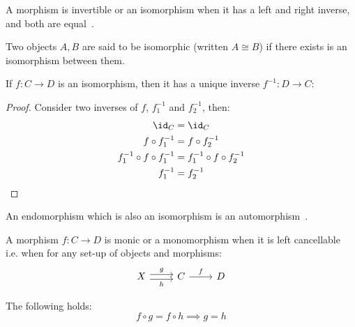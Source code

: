 \begin{definition}[Isomorphism]
  A morphism is invertible or an isomorphism when it has a left and right
  inverse, and both are equal~\parencite[p.~19]{lane:working_mathematician}.
\end{definition}

\begin{remark}
  Two objects $A, B$ are said to be isomorphic (written $A\cong B$) if there
  exists is an isomorphism between them.
\end{remark}

\begin{theorem}
  If $f: C\to D$ is an isomorphism, then it has a unique inverse $f^{-1}:D\to
  C$:
  \begin{proof}
    Consider two inverses of $f$, $f^{-1}_1$ and $f^{-1}_2$, then:
    \[
      \begin{aligned}
        \id_C &= \id_C\\
        f\circ f^{-1}_1 &= f\circ f^{-1}_2\\
        f^{-1}_1 \circ f \circ f^{-1}_1 &= f^{-1}_1 \circ f \circ f^{-1}_2\\
        f^{-1}_1 &= f^{-1}_2
      \end{aligned}
    \]
  \end{proof}
  \vspace{-1.5\baselineskip}
\end{theorem}

\begin{definition}[Automorphism]
  An endomorphism which is also an isomorphism is an
  automorphism~\parencite[p.~7]{riehl:category_theory_in_context}.
\end{definition}

\begin{definition}[Monomorphisms]
  A morphism $f:C\to D$ is monic or a monomorphism when it is left
  cancellable~\parencite[p.~19]{lane:working_mathematician} i.e. when for any
  set-up of objects and morphisms:
  \[\begin{tikzcd}[ampersand replacement=\&]
    X \& C \& D
    \arrow["f", from=1-2, to=1-3]
    \arrow["g", shift left=1, from=1-1, to=1-2]
    \arrow["h"', shift right=1, from=1-1, to=1-2]
  \end{tikzcd}\]

  The following holds:
  \[f \circ g = f \circ h \implies g = h\]
\end{definition}

